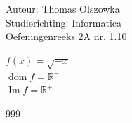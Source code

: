 \documentclass[a4paper]{article}
\begin{document}
\noindent \large Auteur: Thomas Olszowka \\
\noindent \large Studierichting: Informatica\\
\noindent \large Oefeningenreeks 2A nr. 1.10\\

\medskip

\normalsize

$f(x) = \sqrt{-x}$ \\

$\operatorname{dom}f = \mathbb{R}^{-}$ \\

$\operatorname{Im}f = \mathbb{R}^{+}$ \\

\begin{thebibliography}{999}
\end{thebibliography}
\end{document}
